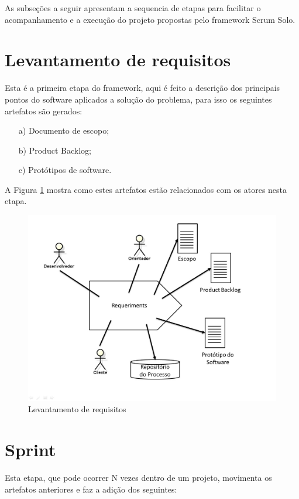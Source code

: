 As subseções a seguir apresentam a sequencia de etapas para facilitar o acompanhamento e a execução do projeto propostas pelo framework Scrum Solo.

\section{Levantamento de requisitos}
Esta é a primeira etapa do framework, aqui é feito a descrição dos principais pontos do software aplicados a solução do problema, para isso os seguintes artefatos são gerados:

\begin{itemize}
    \item[a)] Documento de escopo;
    \item[b)] Product Backlog;
    \item[c)] Protótipos de software.
\end{itemize}

A Figura \ref{sprints} mostra como estes artefatos estão relacionados com os atores nesta etapa.

\begin{figure}[H]
\caption{\label{sprints} Levantamento de requisitos}
\includegraphics[scale=0.33]{img/levantamento-requisitos.jpg}
\end{figure}

\section{Sprint}
Esta etapa, que pode ocorrer N vezes dentro de um projeto, movimenta os artefatos anteriores e faz a adição dos seguintes:

